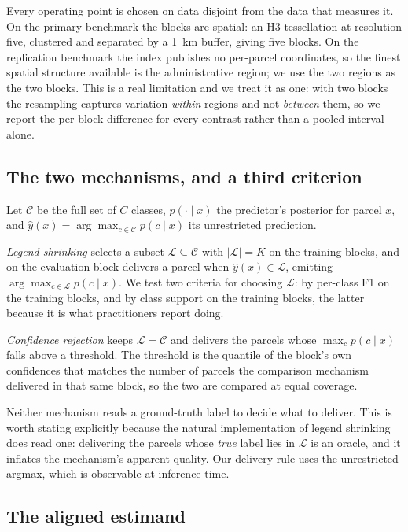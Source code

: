 Every operating point is chosen on data disjoint from the data that measures it. On the primary
benchmark the blocks are spatial: an H3 tessellation at resolution five, clustered and separated by
a \SI{1}{\kilo\meter} buffer, giving five blocks. On the replication benchmark the index publishes
no per-parcel coordinates, so the finest spatial structure available is the administrative region;
we use the two regions as the two blocks. This is a real limitation and we treat it as one: with
two blocks the resampling captures variation \emph{within} regions and not \emph{between} them, so
we report the per-block difference for every contrast rather than a pooled interval alone.

\subsection{The two mechanisms, and a third criterion}
\label{sec:mechanisms}

Let $\mathcal{C}$ be the full set of $C$ classes, $p(\cdot \mid x)$ the predictor's posterior for
parcel $x$, and $\hat{y}(x) = \arg\max_{c \in \mathcal{C}} p(c \mid x)$ its unrestricted
prediction.

\emph{Legend shrinking} selects a subset $\mathcal{L} \subseteq \mathcal{C}$ with
$|\mathcal{L}| = K$ on the training blocks, and on the evaluation block delivers a parcel when
$\hat{y}(x) \in \mathcal{L}$, emitting $\arg\max_{c \in \mathcal{L}} p(c \mid x)$. We test two
criteria for choosing $\mathcal{L}$: by per-class F1 on the training blocks, and by class support
on the training blocks, the latter because it is what practitioners report doing.

\emph{Confidence rejection} keeps $\mathcal{L} = \mathcal{C}$ and delivers the parcels whose
$\max_c p(c \mid x)$ falls above a threshold. The threshold is the quantile of the block's own
confidences that matches the number of parcels the comparison mechanism delivered in that same
block, so the two are compared at equal coverage.

Neither mechanism reads a ground-truth label to decide what to deliver. This is worth stating
explicitly because the natural implementation of legend shrinking does read one: delivering the
parcels whose \emph{true} label lies in $\mathcal{L}$ is an oracle, and it inflates the mechanism's
apparent quality. Our delivery rule uses the unrestricted argmax, which is observable at inference
time.

\subsection{The aligned estimand}
\label{sec:estimand}

